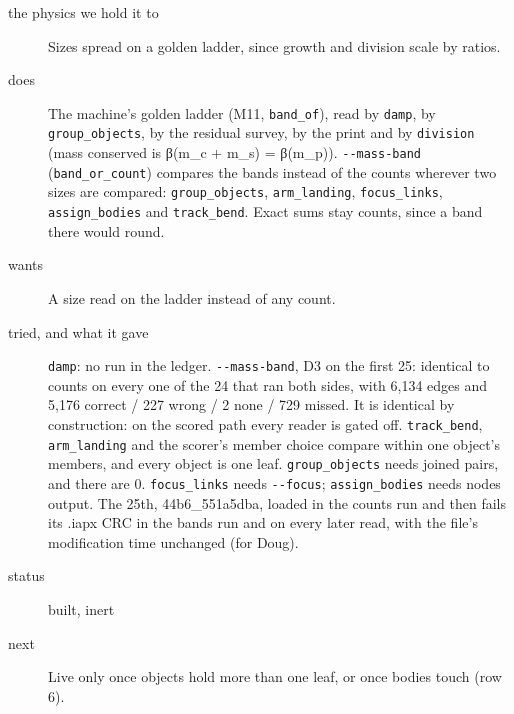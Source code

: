 \begin{description}
\item[{the physics we hold it to}] Sizes spread on a golden ladder, since growth and division scale by ratios.
\item[{does}] The machine's golden ladder (M11, \texttt{band\_\allowbreak{}of}), read by \texttt{damp}, by \texttt{group\_\allowbreak{}objects}, by the residual survey, by the print and by \texttt{division} (mass conserved is β(m\_\allowbreak{}c + m\_\allowbreak{}s) = β(m\_\allowbreak{}p)). \texttt{-\allowbreak{}-\allowbreak{}mass-\allowbreak{}band} (\texttt{band\_\allowbreak{}or\_\allowbreak{}count}) compares the bands instead of the counts wherever two sizes are compared: \texttt{group\_\allowbreak{}objects}, \texttt{arm\_\allowbreak{}landing}, \texttt{focus\_\allowbreak{}links}, \texttt{assign\_\allowbreak{}bodies} and \texttt{track\_\allowbreak{}bend}. Exact sums stay counts, since a band there would round.
\item[{wants}] A size read on the ladder instead of any count.
\item[{tried, and what it gave}] \texttt{damp}: no run in the ledger. \texttt{-\allowbreak{}-\allowbreak{}mass-\allowbreak{}band}, D3 on the first 25: identical to counts on every one of the 24 that ran both sides, with 6,134 edges and 5,176 correct / 227 wrong / 2 none / 729 missed. It is identical by construction: on the scored path every reader is gated off. \texttt{track\_\allowbreak{}bend}, \texttt{arm\_\allowbreak{}landing} and the scorer's member choice compare within one object's members, and every object is one leaf. \texttt{group\_\allowbreak{}objects} needs joined pairs, and there are 0. \texttt{focus\_\allowbreak{}links} needs \texttt{-\allowbreak{}-\allowbreak{}focus}; \texttt{assign\_\allowbreak{}bodies} needs nodes output. The 25th, 44b6\_\allowbreak{}551a5dba, loaded in the counts run and then fails its .iapx CRC in the bands run and on every later read, with the file's modification time unchanged (for Doug).
\item[{status}] built, inert
\item[{next}] Live only once objects hold more than one leaf, or once bodies touch (row 6).
\end{description}

